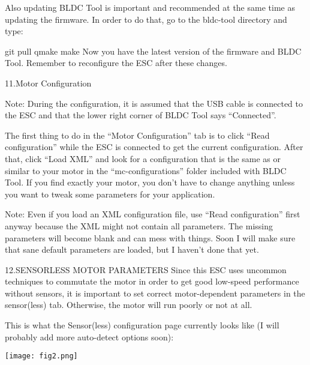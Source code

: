 \documentclass[11pt]{article}
\begin{document}
Also updating BLDC Tool is important and recommended at the same time as updating the firmware. In order to do that, go to the bldc-tool directory and type:\newline

git pull\newline
qmake\newline
make\newline
Now you have the latest version of the firmware and BLDC Tool. Remember to reconfigure the ESC after these changes.\newline

11.Motor Configuration\newline

Note: During the configuration, it is assumed that the USB cable is connected to the ESC and that the lower right corner of BLDC Tool says “Connected”.\newline

The first thing to do in the “Motor Configuration” tab is to click “Read configuration” while the ESC is connected to get the current configuration. After that, click “Load XML” and look for a configuration that is the same as or similar to your motor in the “mc-configurations” folder included with BLDC Tool. If you find exactly your motor, you don’t have to change anything unless you want to tweak some parameters for your application.\newline

Note: Even if you load an XML configuration file, use “Read configuration” first anyway because the XML might not contain all parameters. The missing parameters will become blank and can mess with things. Soon I will make sure that sane default parameters are loaded, but I haven’t done that yet.\newline

12.SENSORLESS MOTOR PARAMETERS\newline
Since this ESC uses uncommon techniques to commutate the motor in order to get good low-speed performance without sensors, it is important to set correct motor-dependent parameters in the sensor(less) tab. Otherwise, the motor will run poorly or not at all.\newline

This is what the Sensor(less) configuration page currently looks like (I will probably add more auto-detect options soon):\newline
\begin {center}
\texttt{[image: fig2.png]}\newline

\end{center}
\end{document}
